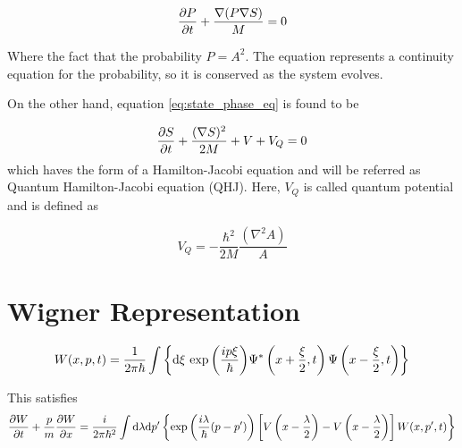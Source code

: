 \begin{equation}
    \frac{\partial P}{\partial t} + \dfrac{\nabla(P\nabla S)}{M} = 0
\end{equation}

Where the fact that the probability $P = A^2$. The equation represents a continuity equation for the probability, so it is conserved as the system evolves. 

On the other hand, equation \eqref{eq:state_phase_eq} is found to be

\begin{equation}
    \frac{\partial S}{\partial t} + \dfrac{(\nabla S)^2}{2M} + V + V_Q = 0
    \label{eq:}
\end{equation}
which haves the form of a Hamilton-Jacobi equation and will be referred as Quantum Hamilton-Jacobi equation (QHJ). Here, $V_Q$ is called quantum potential and is defined as 

\begin{equation}
    V_Q = -\dfrac{\hbar^2}{2M}\dfrac{(\nabla^2 A)}{A}
\end{equation}

\section{Wigner Representation}
\label{sec:Wigner_representation}

\begin{equation}
    W(x, p, t) = \dfrac{1}{2\pi\hbar} \int \left\{\text d\xi\,\exp{\left(\dfrac{i p\xi}{\hbar}\right)} \Psi^*\left(x + \dfrac{\xi}{2}, t\right) \Psi\left(x - \dfrac{\xi}{2}, t\right)\right\}
\end{equation}

This satisfies 
\begin{equation}
    \frac{\partial W}{\partial t} + \dfrac{p}{m}\frac{\partial W}{\partial x} = \dfrac{i}{2\pi\hbar^2} \int\text d\lambda\text d p^\prime \left\{\exp{\left(\dfrac{i \lambda}{\hbar}(p-p^\prime)\right)}\left[V\left(x-\dfrac{\lambda}{2}\right) - V\left(x-\dfrac{\lambda}{2}\right)\right]W(x, p^\prime, t)\right\}
\end{equation}
